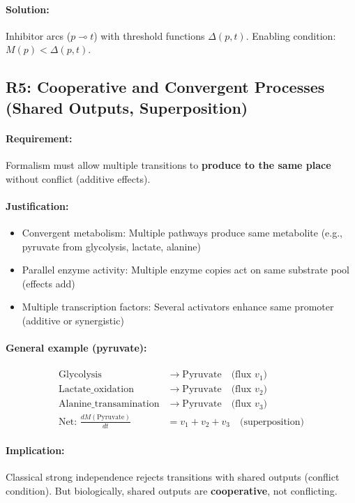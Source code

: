\paragraph{Solution:} Inhibitor arcs ($p \multimap t$) with threshold functions $\Delta(p,t)$. Enabling condition: $M(p) < \Delta(p,t)$.

\subsection{R5: Cooperative and Convergent Processes (Shared Outputs, Superposition)}
\label{subsec:r5-cooperative}

\paragraph{Requirement:} Formalism must allow multiple transitions to \textbf{produce to the same place} without conflict (additive effects).

\paragraph{Justification:}
\begin{itemize}
    \item Convergent metabolism: Multiple pathways produce same metabolite (e.g., pyruvate from glycolysis, lactate, alanine)
    \item Parallel enzyme activity: Multiple enzyme copies act on same substrate pool (effects add)
    \item Multiple transcription factors: Several activators enhance same promoter (additive or synergistic)
\end{itemize}

\paragraph{General example (pyruvate):}
\begin{align}
\text{Glycolysis} &\to \text{Pyruvate} \quad \text{(flux } v_1\text{)} \\
\text{Lactate\_oxidation} &\to \text{Pyruvate} \quad \text{(flux } v_2\text{)} \\
\text{Alanine\_transamination} &\to \text{Pyruvate} \quad \text{(flux } v_3\text{)} \\
\text{Net: } \frac{dM(\text{Pyruvate})}{dt} &= v_1 + v_2 + v_3 \quad \text{(superposition)}
\end{align}

\paragraph{Implication:} Classical strong independence rejects transitions with shared outputs (conflict condition). But biologically, shared outputs are \textbf{cooperative}, not conflicting.

